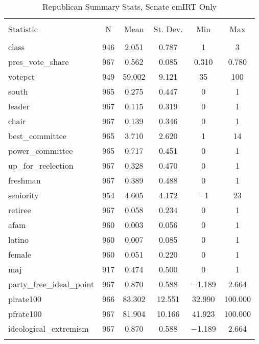 \documentclass[12pt]{article}
\begin{document}
       
\begin{table}[!htbp] \centering 
	\caption{Republican Summary Stats, Senate emIRT Only} 
	\label{} 
	\begin{tabular}{@{\extracolsep{5pt}}lccccc} 
		\\[-1.8ex]\hline 
		\hline \\[-1.8ex] 
		Statistic & \multicolumn{1}{c}{N} & \multicolumn{1}{c}{Mean} & \multicolumn{1}{c}{St. Dev.} & \multicolumn{1}{c}{Min} & \multicolumn{1}{c}{Max} \\ 
		\hline \\[-1.8ex] 
		class & 946 & 2.051 & 0.787 & 1 & 3 \\ 
		pres\_vote\_share & 967 & 0.562 & 0.085 & 0.310 & 0.780 \\ 
		votepct & 949 & 59.002 & 9.121 & 35 & 100 \\ 
		south & 965 & 0.275 & 0.447 & 0 & 1 \\ 
		leader & 967 & 0.115 & 0.319 & 0 & 1 \\ 
		chair & 967 & 0.139 & 0.346 & 0 & 1 \\ 
		best\_committee & 965 & 3.710 & 2.620 & 1 & 14 \\ 
		power\_committee & 965 & 0.717 & 0.451 & 0 & 1 \\ 
		up\_for\_reelection & 967 & 0.328 & 0.470 & 0 & 1 \\ 
		freshman & 967 & 0.389 & 0.488 & 0 & 1 \\ 
		seniority & 954 & 4.605 & 4.172 & $-$1 & 23 \\ 
		retiree & 967 & 0.058 & 0.234 & 0 & 1 \\ 
		afam & 960 & 0.003 & 0.056 & 0 & 1 \\ 
		latino & 960 & 0.007 & 0.085 & 0 & 1 \\ 
		female & 960 & 0.051 & 0.220 & 0 & 1 \\ 
		maj & 917 & 0.474 & 0.500 & 0 & 1 \\ 
		party\_free\_ideal\_point & 967 & 0.870 & 0.588 & $-$1.189 & 2.664 \\ 
		pirate100 & 966 & 83.302 & 12.551 & 32.990 & 100.000 \\ 
		pfrate100 & 967 & 81.904 & 10.166 & 41.923 & 100.000 \\ 
		ideological\_extremism & 967 & 0.870 & 0.588 & $-$1.189 & 2.664 \\ 
		\hline \\[-1.8ex] 
	\end{tabular} 
\end{table} 
\end{document}
